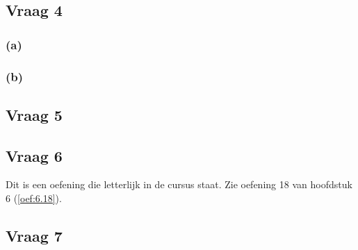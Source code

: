 \documentclass[lineaire_algebra_oplossingen.tex]{subfiles}
\begin{document}
\subsection{Vraag 4}
\subsubsection*{(a)}
\subsubsection*{(b)}


\subsection{Vraag 5}


\subsection{Vraag 6}
Dit is een oefening die letterlijk in de cursus staat. Zie oefening 18 van hoofdstuk 6 (\ref{oef:6.18}).


\subsection{Vraag 7}
\end{document}
